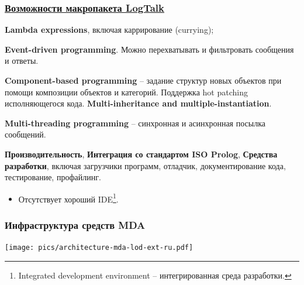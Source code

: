 \documentclass[10pt]{beamer}
\begin{document}
\begin{frame}
  \frametitle{\href{https://logtalk.org/features.html}{Возможности макропакета LogTalk}}
\textbf{Lambda expressions}, включая каррирование (currying);

\textbf{Event-driven programming}. Можно перехватывать и фильтровать сообщения и ответы.


\textbf{Component-based programming} -- задание структур новых объектов при помощи композиции объектов и категорий. Поддержка hot patching исполняющегося кода.
\textbf{Multi-inheritance and multiple-instantiation}.

\textbf{Multi-threading programming} -- синхронная и асинхронная посылка сообщений.

\textbf{Производительность}, \textbf{Интеграция со стандартом ISO Prolog}, \textbf{Средства разработки}, включая загрузчики программ, отладчик, документирование кода, тестирование, профайлинг.

\vspace{1em}
\begin{itemize}
\item Отсутствует хороший IDE\footnote{Integrated development environment -- интегрированная среда разработки.}.
\end{itemize}
\end{frame}

\begin{frame}
  \frametitle{Инфраструктура средств MDA}
  \centering
  \texttt{[image: pics/architecture-mda-lod-ext-ru.pdf]}
\end{frame}
\end{document}
